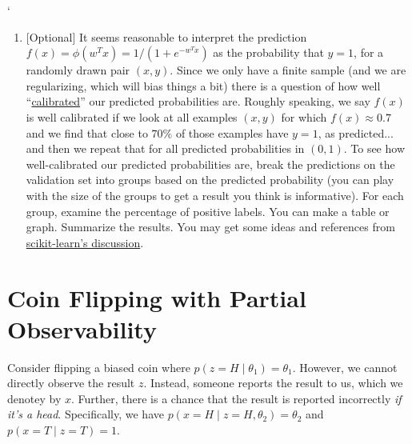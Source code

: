`\documentclass{article}
\theoremstyle{plain}
\theoremstyle{definition}
\begin{document}
\begin{enumerate}
\item {[}Optional{]} 
It seems reasonable to interpret the prediction $f(x)=\phi(w^{T}x)=1/(1+e^{-w^{T}x})$
as the probability that $y=1$, for a randomly drawn pair $\left(x,y\right)$.
Since we only have a finite sample (and we are regularizing, which
will bias things a bit) there is a question of how well ``\href{https://en.wikipedia.org/wiki/Calibration_(statistics)}{calibrated}''
our predicted probabilities are. Roughly speaking, we say $f(x)$
is well calibrated if we look at all examples $\left(x,y\right)$
for which $f(x)\approx0.7$ and we find that close to $70\%$ of those
examples have $y=1$, as predicted... and then we repeat that for
all predicted probabilities in $\left(0,1\right)$. To see how well-calibrated
our predicted probabilities are, break the predictions on the validation
set into groups based on the predicted probability (you can play with
the size of the groups to get a result you think is informative).
For each group, examine the percentage of positive labels. You can
make a table or graph. Summarize the results. You may get some ideas
and references from \href{http://scikit-learn.org/stable/modules/calibration.html}{scikit-learn's discussion}. 
\setcounter{saveenum}{\value{enumi}}
\end{enumerate}
\section{Coin Flipping with Partial Observability}
Consider flipping a biased coin where $p(z=H\mid \theta_1) = \theta_1$.
However, we cannot directly observe the result $z$.
Instead, someone reports the result to us,
which we denotey by $x$.
Further, there is a chance that the result is reported incorrectly \emph{if it's a head}.
Specifically, we have $p(x=H\mid z=H, \theta_2) = \theta_2$
and $p(x=T\mid z=T) = 1$.
\end{document}
